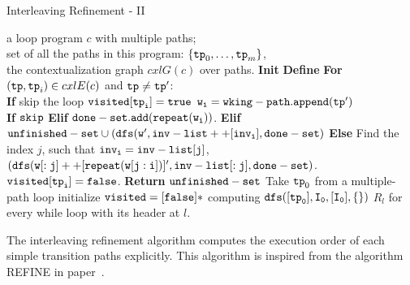   \begin{algorithm}
    \caption{
    {Interleaving Refinement - II}
    \label{alg:prog-refine}
    }
    \begin{algorithmic}[1]
    \REQUIRE a loop program $c$ with multiple paths;
    \\
    set of all the paths in this program:
    $\{\mathtt{tp}_0, \ldots, \mathtt{tp}_m\}$,
    \\
    the contextualization graph $cxlG(c)$ over paths.
    \STATE  \textbf{Init} 
    \STATE \textbf{Define} 
    \STATE {}
    \STATE {}
    \STATE \quad \textbf{For} $(\mathtt{tp}, \mathtt{tp}_i) \in cxlE(c)$ and $\mathtt{tp} \neq \mathtt{tp}'$:
    \\
    \STATE \quad \quad \textbf{If}  skip the loop
    \STATE \quad \quad $\mathtt{visited[\mathtt{tp}_i]} = \mathtt{true}$
    \STATE \quad \quad $\mathtt{w_i = wking-path.append(\mathtt{tp}')}$
    \\
    \quad \quad {}
    \STATE \quad \quad \textbf{If}  $\mathtt{skip}$
    \STATE \quad \quad \textbf{Elif}  $\mathtt{done-set.add(\mathtt{repeat}(w_i))}$.
    \STATE \quad \quad \textbf{Elif}  
    $\mathtt{unfinished-set \cup (dfs(w', inv-list++[inv_i], done-set)}$
    \STATE \quad \quad \textbf{Else} 
    Find the index $j$, such that $\mathtt{inv_i = inv-list[j] }$,
    \STATE \quad \quad \quad
    $\mathtt{(dfs(w[:j]++[\mathtt{repeat}(w[j:i])]', inv-list[:j], done-set)}$.
    \STATE \quad \quad $\mathtt{visited[\mathtt{tp}_i]} = \mathtt{false}$.
    \STATE \quad \textbf{Return} $\mathtt{unfinished-set}$
    \STATE Take $\mathtt{tp}_0$ from a multiple-path loop 
    \STATE initialize $\mathtt{visited} = [\mathtt{false}]*$
    \STATE computing $\mathtt{dfs([\mathtt{tp}_0], I_0, [I_0], \{\} )}$
    \RETURN $R_l$ for every while loop with its header at $l$.
    \end{algorithmic}
    \end{algorithm}



The interleaving refinement algorithm computes the execution order of each simple transition paths explicitly.
This algorithm is inspired from the algorithm REFINE in paper~\cite{GulwaniJK09}. 

